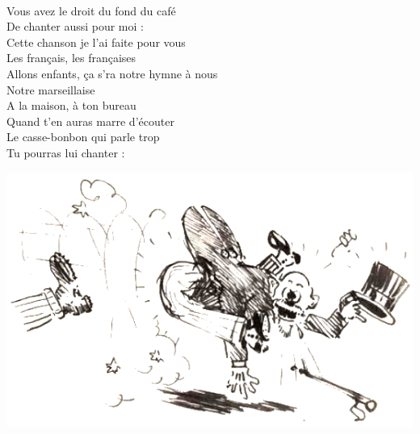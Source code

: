 \\Vous avez le droit du fond du café
\\De chanter aussi pour moi :
\\Cette chanson je l'ai faite pour vous
\\Les français, les françaises
\\Allons enfants, ça s'ra notre hymne à nous
\\Notre marseillaise
\\A la maison, à ton bureau
\\Quand t'en auras marre d'écouter
\\Le casse-bonbon qui parle trop
\\Tu pourras lui chanter :

\vspace{1cm}
\begin{center}
\includegraphics[width=1\textwidth]{images/brev75.png}
\end{center}

\breakpage